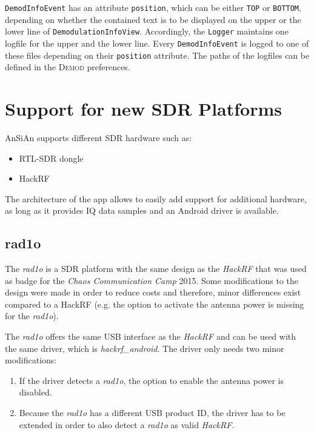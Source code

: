 \texttt{DemodInfoEvent} has an attribute \texttt{position}, which can be either \texttt{TOP} or \texttt{BOTTOM}, depending on whether the contained text is to be displayed on the upper or the lower line of \texttt{DemodulationInfoView}. Accordingly, the \texttt{Logger} maintains one logfile for the upper and the lower line. Every \texttt{DemodInfoEvent} is logged to one of these files depending on their \texttt{position} attribute. The paths of the logfiles can be defined in the \textsc{Demod} preferences.


\section{Support for new SDR Platforms}

\ac{AnSiAn} supports different \ac{SDR} hardware such as:
\begin{itemize}
	\item RTL-SDR dongle
	\item HackRF
\end{itemize}

The architecture of the app allows to easily add support for additional hardware,
as long as it provides IQ data samples and an Android driver is available.

\subsection{rad1o}

The \emph{rad1o} is a \ac{SDR} platform with the same design as the
\emph{HackRF} that was used as badge for the \emph{Chaos Communication Camp}
2015. Some modifications to the design were made in order to reduce costs and
therefore, minor differences exist compared to a HackRF (e.g. the option to
activate the antenna power is missing for the \emph{rad1o}).

The \emph{rad1o} offers the same USB interface as the \emph{HackRF} and can be
used with the same driver, which is \emph{hackrf\_android}. The driver only needs
two minor modifications:
\begin{enumerate}
	\item If the driver detects a \emph{rad1o}, the option to enable the antenna power
		is disabled.
	\item Because the \emph{rad1o} has a different USB product ID, the driver has
		to be extended in order to also detect a \emph{rad1o} as valid \emph{HackRF}.
\end{enumerate}

